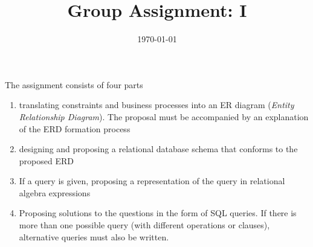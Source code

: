 \documentclass[a4paper,11pt]{article}
\date{\today}
\title{Group Assignment: I}
\begin{document}
    \header{}
 \selectfont
\begin{deliverablebox}{The assignment consists of four parts}
  \begin{enumerate}
    \itemsep0em
    \item translating constraints and business processes into an ER diagram (\textit{Entity Relationship Diagram}). The proposal must be accompanied by an explanation of the ERD formation process
     \item designing and proposing a relational database schema that conforms to the proposed ERD
     \item If a query is given, proposing a representation of the query in relational algebra expressions
     \item Proposing solutions to the questions in the form of SQL queries. If there is more than one possible query (with different operations or clauses), alternative queries must also be written.
\end{enumerate}  
\end{deliverablebox}
\end{document}
